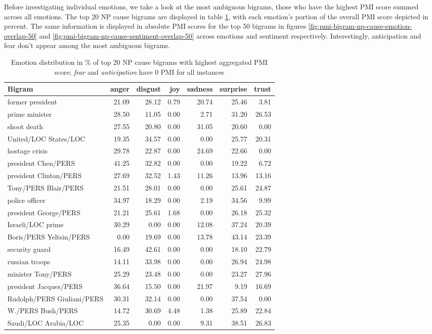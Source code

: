 Before investigating individual emotions, we take a look at the most ambiguous bigrams, those who have the highest PMI score summed across all emotions. The top 20 NP cause bigrams are displayed in table \ref{tab:percent-bigrams-overlap-pmi}, with each emotion's portion of the overall PMI score depicted in percent. The same information is displayed in absolute PMI scores for the top 50 bigrams in figures \ref{fig:pmi-bigram-np-cause-emotion-overlap-50} and \ref{fig:pmi-bigram-np-cause-sentiment-overlap-50} across emotions and sentiment respectively. 
Interestingly, anticipation and fear don't appear among the most ambiguous bigrams.

\begin{table}[h]
\centering
\begin{tabular}{l|r|r|r|r|r|r}
{\bf Bigram} & {\bf anger} & {\bf disgust} & {\bf joy} & {\bf sadness} & {\bf surprise} & {\bf trust} \\\hline
former president & 21.09 & 28.12 & 0.79 & 20.74 & 25.46 & 3.81 \\
prime minister & 28.50 & 11.05 & 0.00 & 2.71 & 31.20 & 26.53 \\
shoot death & 27.55 & 20.80 & 0.00 & 31.05 & 20.60 & 0.00 \\
United/LOC States/LOC & 19.35 & 34.57 & 0.00 & 0.00 & 25.77 & 20.31 \\
hostage crisis & 29.78 & 22.87 & 0.00 & 24.69 & 22.66 & 0.00 \\
president Chen/PERS & 41.25 & 32.82 & 0.00 & 0.00 & 19.22 & 6.72 \\
president Clinton/PERS & 27.69 & 32.52 & 1.43 & 11.26 & 13.96 & 13.16 \\
Tony/PERS Blair/PERS & 21.51 & 28.01 & 0.00 & 0.00 & 25.61 & 24.87 \\
police officer & 34.97 & 18.29 & 0.00 & 2.19 & 34.56 & 9.99 \\
president George/PERS & 21.21 & 25.61 & 1.68 & 0.00 & 26.18 & 25.32 \\
Israeli/LOC prime & 30.29 & 0.00 & 0.00 & 12.08 & 37.24 & 20.39 \\
Boris/PERS Yeltsin/PERS & 0.00 & 19.69 & 0.00 & 13.78 & 43.14 & 23.39 \\
security guard & 16.49 & 42.61 & 0.00 & 0.00 & 18.10 & 22.79 \\
russian troops & 14.11 & 33.98 & 0.00 & 0.00 & 26.94 & 24.98 \\
minister Tony/PERS & 25.29 & 23.48 & 0.00 & 0.00 & 23.27 & 27.96 \\
president Jacques/PERS & 36.64 & 15.50 & 0.00 & 21.97 & 9.19 & 16.69 \\
Rudolph/PERS Giuliani/PERS & 30.31 & 32.14 & 0.00 & 0.00 & 37.54 & 0.00 \\
W./PERS Bush/PERS & 14.72 & 30.69 & 4.48 & 1.38 & 25.89 & 22.84 \\
Saudi/LOC Arabia/LOC & 25.35 & 0.00 & 0.00 & 9.31 & 38.51 & 26.83
\end{tabular}
\caption{Emotion distribution in \% of top 20 NP cause bigrams with highest aggregated PMI score; \textit{fear} and \textit{anticipation} have 0 PMI for all instances}
\label{tab:percent-bigrams-overlap-pmi}
\end{table}

